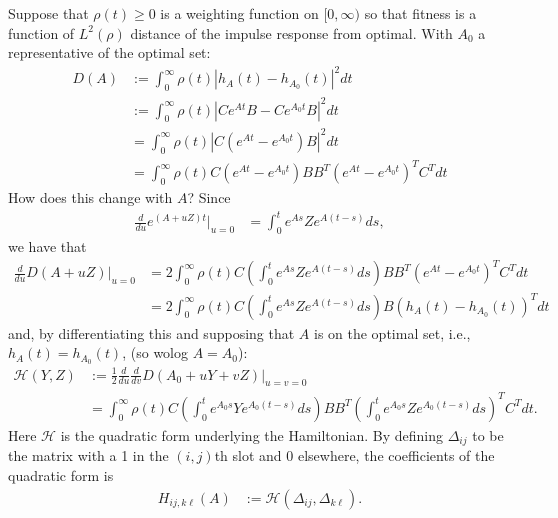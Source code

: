 \documentclass{article}
\newcommand{\calH}{\mathcal{H}}
\newcommand{\1}{\mathbbm{1}}
\begin{document}
Suppose that $\rho(t) \ge 0$ is a weighting function on $[0,\infty)$
so that fitness is a function of $L^2(\rho)$ distance of the impulse response from optimal.
With $A_0$ a representative of the optimal set:
\begin{equation}
    \begin{aligned}
        D(A) 
        &:= 
        \int_0^\infty \rho(t) \left| h_A(t) - h_{A_0}(t) \right|^2 dt \\
        &:= 
        \int_0^\infty \rho(t) \left| C e^{At} B - C e^{A_0 t} B \right|^2 dt \\
        &= 
        \int_0^\infty \rho(t) \left| C \left( e^{At} - e^{A_0 t} \right) B \right|^2 dt \\
        &= 
        \int_0^\infty \rho(t) C \left( e^{At} - e^{A_0 t} \right) B B^T \left( e^{At} - e^{A_0 t} \right)^T C^T dt
    \end{aligned}
\end{equation}
How does this change with $A$?
Since
\begin{equation}
  \begin{aligned}
      \frac{d}{du} e^{(A+uZ)t} \vert_{u=0}
      &=
      \int_0^t e^{As} Z e^{A(t-s)} ds, 
  \end{aligned}
\end{equation}
we have that
\begin{equation}
  \begin{aligned}
      \frac{d}{du} D(A+uZ)\vert_{u=0}
      &=
        2 \int_0^\infty \rho(t) C \left( \int_0^t e^{As} Z e^{A(t-s)} ds \right) B B^T \left( e^{At} - e^{A_0 t} \right)^T C^T dt \\
      &=
        2 \int_0^\infty \rho(t) C \left( \int_0^t e^{As} Z e^{A(t-s)} ds \right) B \left( h_A(t) - h_{A_0}(t) \right)^T dt 
  \end{aligned}
\end{equation}
and, by differentiating this and supposing that $A$ is on the optimal set,
i.e., $h_A(t)=h_{A_0}(t)$, (so wolog $A=A_0$):
\begin{equation}
  \begin{aligned}
      \calH(Y,Z) &:= \frac{1}{2} \frac{d}{du} \frac{d}{dv} D(A_0+uY+vZ)\vert_{u=v=0} \\
      &=
        \int_0^\infty \rho(t) C 
        \left( \int_0^t e^{A_0 s} Y e^{A_0 (t-s)} ds \right) 
        B B^T 
        \left( \int_0^t e^{A_0 s} Z e^{A_0 (t-s)} ds \right)^T
        C^T dt  .
  \end{aligned}
\end{equation}
Here $\calH$ is the quadratic form underlying the Hamiltonian.
By defining $\Delta_{ij}$ to be the matrix with a 1 in the $(i,j)$th slot
and 0 elsewhere,
the coefficients of the quadratic form is
\begin{equation}
    \begin{aligned}
        H_{ij, k\ell}(A)
        &:=
        \calH(\Delta_{ij}, \Delta_{k\ell}) .
    \end{aligned}
\end{equation}
\end{document}
